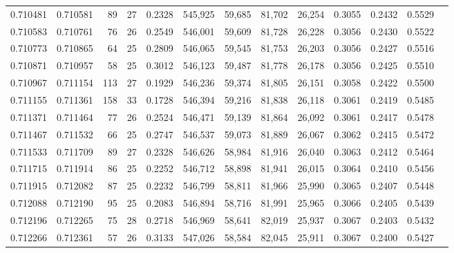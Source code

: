 \begin{tabular}{rrrrrrrrrrrrr}
0.710481 & 0.710581 &    89 &  27 &                                     0.2328 & 545,925 &  59,685 &  81,702 &  26,254 & 0.3055 & 0.2432 & 0.5529 \\
0.710583 & 0.710761 &    76 &  26 &                                     0.2549 & 546,001 &  59,609 &  81,728 &  26,228 & 0.3056 & 0.2430 & 0.5522 \\
0.710773 & 0.710865 &    64 &  25 &                                     0.2809 & 546,065 &  59,545 &  81,753 &  26,203 & 0.3056 & 0.2427 & 0.5516 \\
0.710871 & 0.710957 &    58 &  25 &                                     0.3012 & 546,123 &  59,487 &  81,778 &  26,178 & 0.3056 & 0.2425 & 0.5510 \\
0.710967 & 0.711154 &   113 &  27 &                                     0.1929 & 546,236 &  59,374 &  81,805 &  26,151 & 0.3058 & 0.2422 & 0.5500 \\
0.711155 & 0.711361 &   158 &  33 &                                     0.1728 & 546,394 &  59,216 &  81,838 &  26,118 & 0.3061 & 0.2419 & 0.5485 \\
0.711371 & 0.711464 &    77 &  26 &                                     0.2524 & 546,471 &  59,139 &  81,864 &  26,092 & 0.3061 & 0.2417 & 0.5478 \\
0.711467 & 0.711532 &    66 &  25 &                                     0.2747 & 546,537 &  59,073 &  81,889 &  26,067 & 0.3062 & 0.2415 & 0.5472 \\
0.711533 & 0.711709 &    89 &  27 &                                     0.2328 & 546,626 &  58,984 &  81,916 &  26,040 & 0.3063 & 0.2412 & 0.5464 \\
0.711715 & 0.711914 &    86 &  25 &                                     0.2252 & 546,712 &  58,898 &  81,941 &  26,015 & 0.3064 & 0.2410 & 0.5456 \\
0.711915 & 0.712082 &    87 &  25 &                                     0.2232 & 546,799 &  58,811 &  81,966 &  25,990 & 0.3065 & 0.2407 & 0.5448 \\
0.712088 & 0.712190 &    95 &  25 &                                     0.2083 & 546,894 &  58,716 &  81,991 &  25,965 & 0.3066 & 0.2405 & 0.5439 \\
0.712196 & 0.712265 &    75 &  28 &                                     0.2718 & 546,969 &  58,641 &  82,019 &  25,937 & 0.3067 & 0.2403 & 0.5432 \\
0.712266 & 0.712361 &    57 &  26 &                                     0.3133 & 547,026 &  58,584 &  82,045 &  25,911 & 0.3067 & 0.2400 & 0.5427 \\

\end{tabular}
